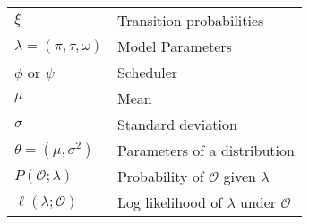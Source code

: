 \begin{table}[htb!]
\begin{tabular}{ll}
        $\xi$                           & Transition probabilities                        \\
        $\lambda = (\pi, \tau, \omega)$ & Model Parameters                                \\
        $\phi$ or $\psi$                & Scheduler                                       \\
        $\mu$                           & Mean                                            \\
        $\sigma$                        & Standard deviation                              \\
        $\theta = (\mu, \sigma^2)$      & Parameters of a distribution                    \\
        $P(\mathcal{O}; \lambda)$       & Probability of $\mathcal{O}$ given $\lambda$    \\
        $\ell(\lambda ;\mathcal{O})$    & Log likelihood of $\lambda$ under $\mathcal{O}$ \\
        \bottomrule
    \end{tabular}
\end{table}
